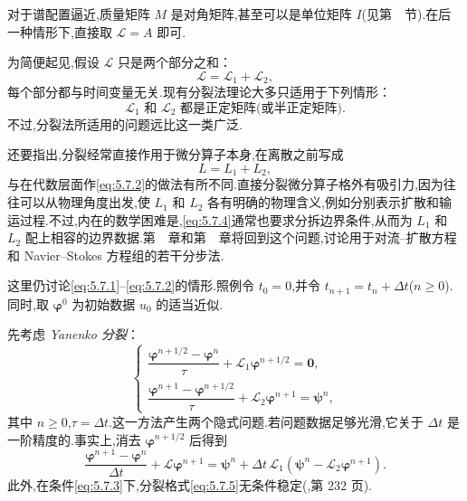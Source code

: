 对于谱配置逼近,质量矩阵 \(M\) 是对角矩阵,甚至可以是单位矩阵 \(I\)(见第~~节).在后一种情形下,直接取 \(\mathcal L=A\) 即可.

为简便起见,假设 \(\mathcal L\) 只是两个部分之和：
\begin{equation}\label{eq:5.7.2}
  \mathcal L=\mathcal L_1+\mathcal L_2,
\end{equation}
每个部分都与时间变量无关.现有分裂法理论大多只适用于下列情形：
\begin{equation}\label{eq:5.7.3}
  \text{\(\mathcal L_1\) 和 \(\mathcal L_2\) 都是正定矩阵(或半正定矩阵).}
\end{equation}
不过,分裂法所适用的问题远比这一类广泛.

还要指出,分裂经常直接作用于微分算子本身,在离散之前写成
\begin{equation}\label{eq:5.7.4}
  L=L_1+L_2,
\end{equation}
与在代数层面作\eqref{eq:5.7.2}的做法有所不同.直接分裂微分算子格外有吸引力,因为往往可以从物理角度出发,使 \(L_1\) 和 \(L_2\) 各有明确的物理含义,例如分别表示扩散和输运过程.不过,内在的数学困难是,\eqref{eq:5.7.4}通常也要求分拆边界条件,从而为 \(L_1\) 和 \(L_2\) 配上相容的边界数据.第~~章和第~~章将回到这个问题,讨论用于对流--扩散方程和 Navier--Stokes 方程组的若干分步法.

这里仍讨论\eqref{eq:5.7.1}–\eqref{eq:5.7.2}的情形.照例令 \(t_0=0\),并令 \(t_{n+1}=t_n+\Delta t\)(\(n\ge0\)).同时,取 \(\boldsymbol{\varphi}^0\) 为初始数据 \(u_0\) 的适当近似.

先考虑 \emph{Yanenko 分裂}：
\begin{equation}\label{eq:5.7.5}
  \begin{cases}
    \dfrac{\boldsymbol{\varphi}^{n+1/2}-\boldsymbol{\varphi}^n}{\tau}
     +\mathcal L_1\boldsymbol{\varphi}^{n+1/2}=\boldsymbol{0},\\[4pt]
    \dfrac{\boldsymbol{\varphi}^{n+1}-\boldsymbol{\varphi}^{n+1/2}}{\tau}
     +\mathcal L_2\boldsymbol{\varphi}^{n+1}=\boldsymbol{\psi}^n,
  \end{cases}
\end{equation}
其中 \(n\ge0\),\(\tau=\Delta t\).这一方法产生两个隐式问题.若问题数据足够光滑,它关于 \(\Delta t\) 是一阶精度的.事实上,消去 \(\boldsymbol{\varphi}^{n+1/2}\) 后得到
\[
  \frac{\boldsymbol{\varphi}^{n+1}-\boldsymbol{\varphi}^n}{\Delta t}
  +\mathcal L\boldsymbol{\varphi}^{n+1}
   =\boldsymbol{\psi}^n+\Delta t\,\mathcal L_1
          (\boldsymbol{\psi}^n-\mathcal L_2\boldsymbol{\varphi}^{n+1}).
\]
此外,在条件\eqref{eq:5.7.3}下,分裂格式\eqref{eq:5.7.5}无条件稳定(,第 232 页).


